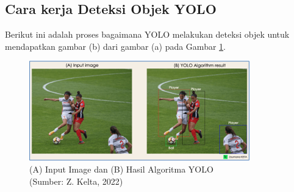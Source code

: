 \subsection{Cara kerja Deteksi Objek YOLO}
\hspace{1,2cm}Berikut ini adalah proses bagaimana YOLO melakukan deteksi objek untuk mendapatkan gambar (b) dari gambar (a) pada Gambar \ref{img:Cara-Kerja-YOLO}.

\begin{figure}[H]
	\vspace{-0.1cm}
	\begin{center}
		\includegraphics[width=0.9\columnwidth]{bab2/Gambar/Picture31.png}
	\end{center}
	\vspace{-0.2cm}
	\captionsetup{justification=centering}
	\caption{(A) Input Image dan (B) Hasil Algoritma YOLO\\(Sumber: Z. Kelta, 2022)}\label{img:Cara-Kerja-YOLO}
\end{figure}


